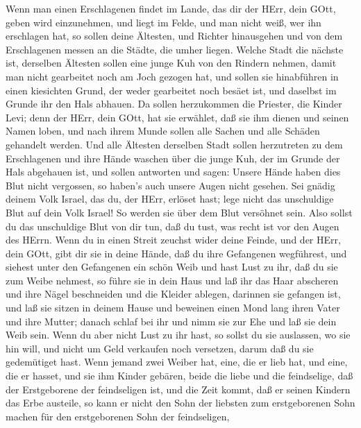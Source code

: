 Wenn man einen Erschlagenen findet im Lande, das dir der
HErr, dein GOtt, geben wird einzunehmen, und liegt im Felde, und man
nicht weiß, wer ihn erschlagen hat,  so sollen deine
Ältesten, und Richter hinausgehen und von dem Erschlagenen messen an die
Städte, die umher liegen.  Welche Stadt die nächste ist,
derselben Ältesten sollen eine junge Kuh von den Rindern nehmen, damit
man nicht gearbeitet noch am Joch gezogen hat,  und sollen
sie hinabführen in einen kiesichten Grund, der weder gearbeitet noch
besäet ist, und daselbst im Grunde ihr den Hals abhauen.  Da
sollen herzukommen die Priester, die Kinder Levi; denn der HErr, dein
GOtt, hat sie erwählet, daß sie ihm dienen und seinen Namen loben, und
nach ihrem Munde sollen alle Sachen und alle Schäden gehandelt werden.
 Und alle Ältesten derselben Stadt sollen herzutreten zu dem
Erschlagenen und ihre Hände waschen über die junge Kuh, der im Grunde
der Hals abgehauen ist,  und sollen antworten und sagen:
Unsere Hände haben dies Blut nicht vergossen, so haben's auch unsere
Augen nicht gesehen.  Sei gnädig deinem Volk Israel, das du,
der HErr, erlöset hast; lege nicht das unschuldige Blut auf dein Volk
Israel! So werden sie über dem Blut versöhnet sein.  Also
sollst du das unschuldige Blut von dir tun, daß du tust, was recht ist
vor den Augen des HErrn.  Wenn du in einen Streit zeuchst
wider deine Feinde, und der HErr, dein GOtt, gibt dir sie in deine
Hände, daß du ihre Gefangenen wegführest,  und siehest
unter den Gefangenen ein schön Weib und hast Lust zu ihr, daß du sie zum
Weibe nehmest,  so führe sie in dein Haus und laß ihr das
Haar abscheren und ihre Nägel beschneiden  und die Kleider
ablegen, darinnen sie gefangen ist, und laß sie sitzen in deinem Hause
und beweinen einen Mond lang ihren Vater und ihre Mutter; danach schlaf
bei ihr und nimm sie zur Ehe und laß sie dein Weib sein. 
Wenn du aber nicht Lust zu ihr hast, so sollst du sie auslassen, wo sie
hin will, und nicht um Geld verkaufen noch versetzen, darum daß du sie
gedemütiget hast.  Wenn jemand zwei Weiber hat, eine, die
er lieb hat, und eine, die er hasset, und sie ihm Kinder gebären, beide
die liebe und die feindselige, daß der Erstgeborene der feindseligen
ist,  und die Zeit kommt, daß er seinen Kindern das Erbe
austeile, so kann er nicht den Sohn der liebsten zum erstgeborenen Sohn
machen für den erstgeborenen Sohn der feindseligen, 

